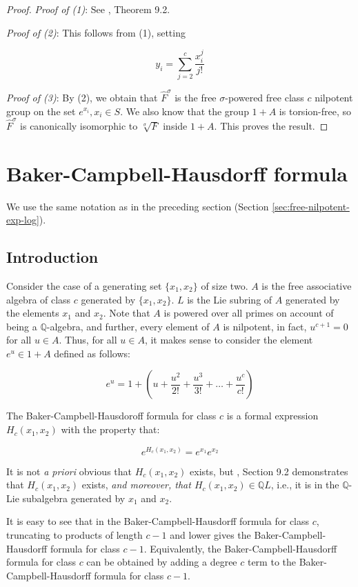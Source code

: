 \documentclass{ucetd}
\begin{document}
\begin{proof}
  {\em Proof of (1)}: See \cite{Khukhro}, Theorem 9.2.

  {\em Proof of (2)}: This follows from (1), setting

  $$y_i = \sum_{j=2}^c \frac{x_i^j}{j!}$$

  {\em Proof of (3)}: By (2), we obtain that $\hat{F}^\sigma$ is the
  free $\sigma$-powered free class $c$ nilpotent group on the set
  $e^{x_i}, x_i \in S$. We also know that the group $1 + A$ is
  torsion-free, so $\hat{F}^\sigma$ is canonically isomorphic to
  $\sqrt[\sigma]{F}$ inside $1 + A$. This proves the result.
\end{proof}

\section{Baker-Campbell-Hausdorff formula}\label{sec:bch}

We use the same notation as in the preceding section (Section
\ref{sec:free-nilpotent-exp-log}).

\subsection{Introduction}

Consider the case of a generating set $\{ x_1,x_2 \}$ of size two. $A$
is the free associative algebra of class $c$ generated by
$\{ x_1,x_2 \}$. $L$ is the Lie subring of $A$ generated by the elements
$x_1$ and $x_2$. Note that $A$ is powered over all primes on account
of being a $\mathbb{Q}$-algebra, and further, every element of $A$ is
nilpotent, in fact, $u^{c+1} = 0$ for all $u \in A$. Thus, for all $u \in
A$, it makes sense to consider the element $e^u \in 1 + A$ defined as
follows:

$$e^u = 1 + \left(u + \frac{u^2}{2!} + \frac{u^3}{3!} + \dots + \frac{u^c}{c!}\right)$$

The Baker-Campbell-Hausdoroff formula for class $c$ is a formal
expression $H_c(x_1,x_2)$ with the property that:

$$e^{H_c(x_1,x_2)} = e^{x_1}e^{x_2}$$

It is not {\em a priori} obvious that $H_c(x_1,x_2)$ exists, but
\cite{Khukhro}, Section 9.2 demonstrates that $H_c(x_1,x_2)$ exists, {\em and
moreover, that $H_c(x_1,x_2) \in \mathbb{Q}L$}, i.e., it is in the
$\mathbb{Q}$-Lie subalgebra generated by $x_1$ and $x_2$.

It is easy to see that in the Baker-Campbell-Hausdorff formula for
class $c$, truncating to products of length $c - 1$ and lower gives
the Baker-Campbell-Hausdorff formula for class $c - 1$. Equivalently,
the Baker-Campbell-Hausdorff formula for class $c$ can be obtained by
adding a degree $c$ term to the Baker-Campbell-Hausdorff formula for
class $c - 1$.
\end{document}
